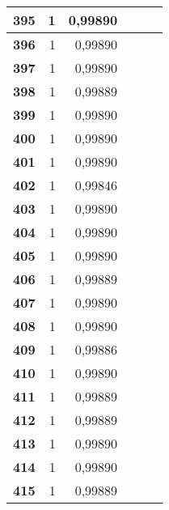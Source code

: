\begin{longtable}{|r|r|r|l|r|r|}
\textbf{395} & 1 & 0,99890 &  & \multicolumn{1}{l|}{} & \multicolumn{1}{l|}{} \\ \hline
\textbf{396} & 1 & 0,99890 &  & \multicolumn{1}{l|}{} & \multicolumn{1}{l|}{} \\ \hline
\textbf{397} & 1 & 0,99890 &  & \multicolumn{1}{l|}{} & \multicolumn{1}{l|}{} \\ \hline
\textbf{398} & 1 & 0,99889 &  & \multicolumn{1}{l|}{} & \multicolumn{1}{l|}{} \\ \hline
\textbf{399} & 1 & 0,99890 &  & \multicolumn{1}{l|}{} & \multicolumn{1}{l|}{} \\ \hline
\textbf{400} & 1 & 0,99890 &  & \multicolumn{1}{l|}{} & \multicolumn{1}{l|}{} \\ \hline
\textbf{401} & 1 & 0,99890 &  & \multicolumn{1}{l|}{} & \multicolumn{1}{l|}{} \\ \hline
\textbf{402} & 1 & 0,99846 &  & \multicolumn{1}{l|}{} & \multicolumn{1}{l|}{} \\ \hline
\textbf{403} & 1 & 0,99890 &  & \multicolumn{1}{l|}{} & \multicolumn{1}{l|}{} \\ \hline
\textbf{404} & 1 & 0,99890 &  & \multicolumn{1}{l|}{} & \multicolumn{1}{l|}{} \\ \hline
\textbf{405} & 1 & 0,99890 &  & \multicolumn{1}{l|}{} & \multicolumn{1}{l|}{} \\ \hline
\textbf{406} & 1 & 0,99889 &  & \multicolumn{1}{l|}{} & \multicolumn{1}{l|}{} \\ \hline
\textbf{407} & 1 & 0,99890 &  & \multicolumn{1}{l|}{} & \multicolumn{1}{l|}{} \\ \hline
\textbf{408} & 1 & 0,99890 &  & \multicolumn{1}{l|}{} & \multicolumn{1}{l|}{} \\ \hline
\textbf{409} & 1 & 0,99886 &  & \multicolumn{1}{l|}{} & \multicolumn{1}{l|}{} \\ \hline
\textbf{410} & 1 & 0,99890 &  & \multicolumn{1}{l|}{} & \multicolumn{1}{l|}{} \\ \hline
\textbf{411} & 1 & 0,99889 &  & \multicolumn{1}{l|}{} & \multicolumn{1}{l|}{} \\ \hline
\textbf{412} & 1 & 0,99889 &  & \multicolumn{1}{l|}{} & \multicolumn{1}{l|}{} \\ \hline
\textbf{413} & 1 & 0,99890 &  & \multicolumn{1}{l|}{} & \multicolumn{1}{l|}{} \\ \hline
\textbf{414} & 1 & 0,99890 &  & \multicolumn{1}{l|}{} & \multicolumn{1}{l|}{} \\ \hline
\textbf{415} & 1 & 0,99889 &  & \multicolumn{1}{l|}{} & \multicolumn{1}{l|}{} \\ \hline

\end{longtable}
